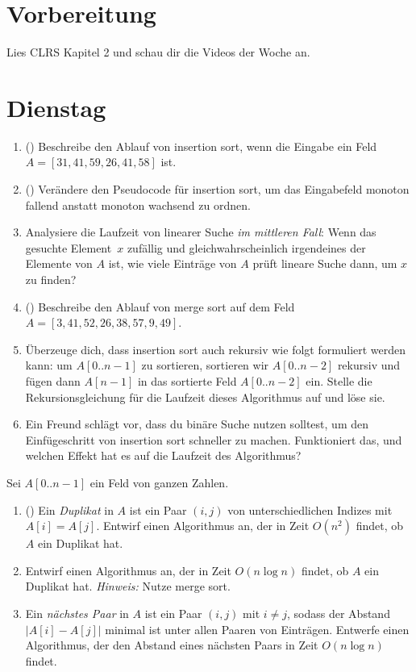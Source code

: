 \documentclass{uebung_cs}
\begin{document}
\section*{Vorbereitung}
Lies CLRS Kapitel 2 und schau dir die Videos der Woche an.

\section*{Dienstag}

\begin{aufgabe}\label{tue-first}\mbox{}
	\begin{enumerate}
		\item (\warmup) Beschreibe den Ablauf von insertion sort, wenn die Eingabe ein Feld $A=[31,41,59,26,41,58]$ ist.
		\item (\warmup) Verändere den Pseudocode für insertion sort, um das Eingabefeld monoton fallend anstatt monoton wachsend zu ordnen.	
		\item Analysiere die Laufzeit von linearer Suche \emph{im mittleren Fall}: Wenn das gesuchte Element~$x$ zufällig und gleichwahrscheinlich irgendeines der Elemente von $A$ ist, wie viele Einträge von $A$ prüft lineare Suche dann, um $x$ zu finden?
		\item (\warmup) Beschreibe den Ablauf von merge sort auf dem Feld $A=[3,41,52,26,38,57,9,49]$.
		\item Überzeuge dich, dass insertion sort auch rekursiv wie folgt formuliert werden kann: um $A[0..n-1]$ zu sortieren, sortieren wir $A[0..n-2]$ rekursiv und fügen dann $A[n-1]$ in das sortierte Feld $A[0..n-2]$ ein. Stelle die Rekursionsgleichung für die Laufzeit dieses Algorithmus auf und löse sie.
		\item Ein Freund schlägt vor, dass du binäre Suche nutzen solltest, um den Einfügeschritt von insertion sort schneller zu machen. Funktioniert das, und welchen Effekt hat es auf die Laufzeit des Algorithmus?
	\end{enumerate}
\end{aufgabe}

\begin{aufgabe}
	Sei $A[0..n-1]$ ein Feld von ganzen Zahlen.
	\begin{enumerate}
		\item (\warmup) Ein \emph{Duplikat} in $A$ ist ein Paar $(i,j)$ von unterschiedlichen Indizes mit $A[i]=A[j]$. Entwirf einen Algorithmus an, der in Zeit $O(n^2)$ findet, ob $A$ ein Duplikat hat.
		\item Entwirf einen Algorithmus an, der in Zeit $O(n\log n)$ findet, ob $A$ ein Duplikat hat. \emph{Hinweis:} Nutze merge sort.
		\item Ein \emph{nächstes Paar} in $A$ ist ein Paar $(i,j)$ mit $i\ne j$, sodass der Abstand $|A[i]-A[j]|$ minimal ist unter allen Paaren von Einträgen.
		Entwerfe einen Algorithmus, der den Abstand eines nächsten Paars in Zeit $O(n\log n)$ findet.
	\end{enumerate}
\end{aufgabe}
\end{document}
